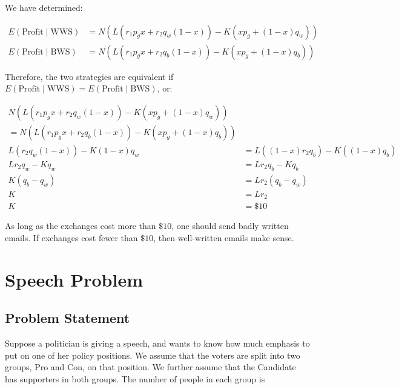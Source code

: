 \documentclass{article}
\begin{document}
We have determined:

\begin{align}
E\left( \text{Profit} \mid \text{WWS} \right)
	& = N \left( L \left( 
		r_1 p_g x
		+ r_2 q_w (1-x)  \right) 
	- K \left(x p_g + (1 - x) q_w \right) \right) \nonumber \\
E\left( \text{Profit} \mid \text{BWS} \right)
	& = N \left( L \left( 
		r_1 p_g x
		+ r_2 q_b (1-x)  \right) 
	- K \left(x p_g + (1 - x) q_b \right) \right) \nonumber
\end{align}

Therefore, the two strategies are equivalent if  
	$E\left( \text{Profit} \mid \text{WWS} \right) = 
	E\left( \text{Profit} \mid \text{BWS} \right)$,
or:

\begin{align}
	N \left( L \left( 
		r_1 p_g x
		+ r_2 q_w (1-x)  \right) 
	- K \left(x p_g + (1 - x) q_w \right) \right) \nonumber \\
 = N \left( L \left( 
		r_1 p_g x
		+ r_2 q_b (1-x)  \right) 
	- K \left(x p_g + (1 - x) q_b \right) \right) \nonumber \\
	L \left( 
		r_2 q_w (1-x)  \right) 
	- K (1 - x) q_w
& = L \left((1 - x) 
		r_2 q_b  \right) 
	- K \left((1 - x) q_b \right) \nonumber \\
	L r_2 q_w
	- K  q_w
& = L r_2 q_b
	- K  q_b  \nonumber \\
K (q_b - q_w) & = L r_2 (q_b - q_w) \nonumber \\
K & = L r_2\\
K & = \$ 10 
\end{align}

As long as the exchanges cost more than $\$10$, one should send badly
	written emails.
If exchanges cost fewer than $\$10$, then well-written emails make sense.

\section{Speech Problem}

\subsection{Problem Statement}

Suppose a politician is giving a speech, and wants to know how much
	emphasis to put on one of her policy positions.
We assume that the voters are split into two groups, Pro and Con, 
	on that position.
We further assume that the Candidate has supporters in both groups.
The number of people in each group is
\end{document}

